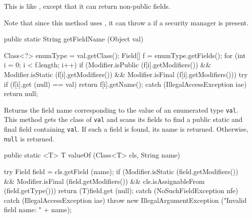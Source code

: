 \begin{tabb}   This is like ,
 except that it can return non-public fields.

 Note that since this method uses
 ,
 it can throw a  if
 a security manager is present.
\end{tabb}
\begin{htmlonly}
\end{htmlonly}
\begin{code}

   public static String getFieldName (Object val)\begin{hide} {
      Class<?> enumType = val.getClass();
      Field[] f = enumType.getFields();
      for (int i = 0; i < f.length; i++) {
         if (Modifier.isPublic (f[i].getModifiers()) &&
             Modifier.isStatic (f[i].getModifiers()) &&
             Modifier.isFinal (f[i].getModifiers())) {
            try {
               if (f[i].get (null) == val)
                  return f[i].getName();
            }
            catch (IllegalAccessException iae) {}
         }
      }
      return null;
   }\end{hide}
\end{code}
\begin{tabb}   Returns the field name corresponding to the value of
 an enumerated type \texttt{val}.
 This method gets the class of \texttt{val} and
 scans its fields to find a public static and final field
 containing \texttt{val}. If such a field is found,
 its name is returned. Otherwise, \texttt{null} is returned.
\end{tabb}
\begin{htmlonly}
\end{htmlonly}
\begin{code}

   public static <T> T valueOf (Class<T> cls, String name)\begin{hide} {
      try {
         Field field = cls.getField (name);
         if (Modifier.isStatic (field.getModifiers()) &&
             Modifier.isFinal (field.getModifiers()) &&
             cls.isAssignableFrom (field.getType()))
            return (T)field.get (null);
      }
      catch (NoSuchFieldException nfe) {}
      catch (IllegalAccessException iae) {}
      throw new IllegalArgumentException ("Invalid field name: " + name);
   }\end{hide}
\end{code}
